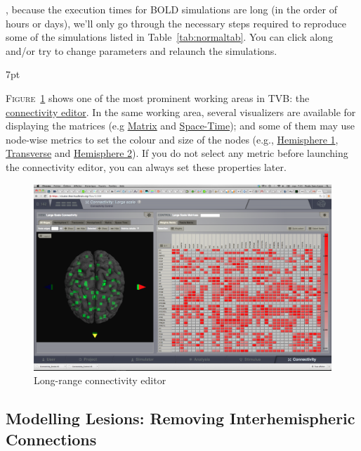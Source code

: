 \documentclass{tufte-handout}
\newenvironment{blah}{%
  \def\FrameCommand{%
    \hspace{1pt}%
    {\color{DarkOrange}\vrule width 2pt}%
    {\color{PeachPuff}\vrule width 4pt}%
    \colorbox{PeachPuff}%
  }%
  \MakeFramed{\advance\hsize-\width\FrameRestore}%
  \noindent\hspace{-4.55pt}%
  \begin{adjustwidth}{}{7pt}%
  \vspace{2pt}\vspace{2pt}%
}
{%
  \vspace{2pt}\end{adjustwidth}\endMakeFramed%
}
\begin{document}
, because the execution times for BOLD simulations
are long (in the order of hours or days), we'll only go through the necessary
steps required to reproduce some of the simulations listed in
Table~\ref{tab:normaltab}. You can click along and/or try to change
parameters and relaunch the simulations.


\begin{blah}
\textsc{Figure}~\ref{fig:fig} shows one of the most prominent working areas in
\textsc{TVB}: the \underline{connectivity editor}. In the same working area,  several
visualizers are available for displaying the matrices (e.g \underline{Matrix} and \underline{Space-Time}); and some of them may use node-wise
metrics to set the colour and size of the nodes (e.g., \underline{Hemisphere 1}, \underline{Transverse} and \underline{Hemisphere 2}). If you do not select any
metric before launching the connectivity editor, you can always set these
properties later.
\end{blah}

\begin{figure}[h]
  \includegraphics[width=\linewidth]{Handout_UI_ModellingStructuralLesions_ConnectivityArea}%
  \caption{Long-range connectivity editor}%
  \label{fig:fig}%
\end{figure}


\newpage
\subsection{Modelling Lesions: Removing Interhemispheric Connections}\label{sec:steps}
\end{document}
